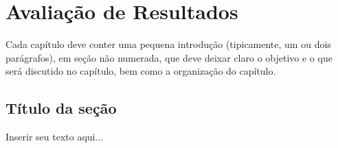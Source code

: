 
\chapter{Avaliação de Resultados}

Cada capítulo deve conter uma pequena introdução (tipicamente, um ou dois parágrafos), em seção não numerada, que deve deixar claro o objetivo e o que será discutido no capítulo, bem como a organização do capítulo.

\section{Título da seção}
\label{sec:titSecResult}

Inserir seu texto aqui...
